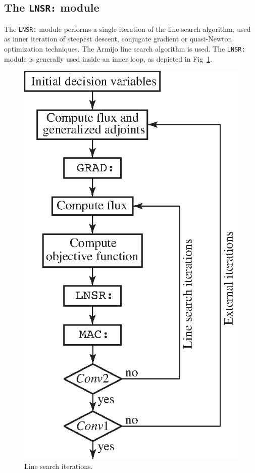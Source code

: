 \subsection{The \texttt{LNSR:} module}

The {\tt LNSR:} module performs a single iteration of the line search algorithm, used as inner iteration of steepest descent,
conjugate gradient or quasi-Newton optimization techniques.\cite{recipie} The Armijo line search algorithm is used.\cite{armijo}
The {\tt LNSR:} module is generally used inside an inner loop, as depicted in Fig~\ref{fig:fig_lnsr}.

\vskip 0.2cm

\begin{figure}[h!]
\begin{center}
\includegraphics[scale=0.85]{Figures/lnsr.eps} 
\caption{Line search iterations.}\label{fig:fig_lnsr}
\end{center}
\end{figure}

